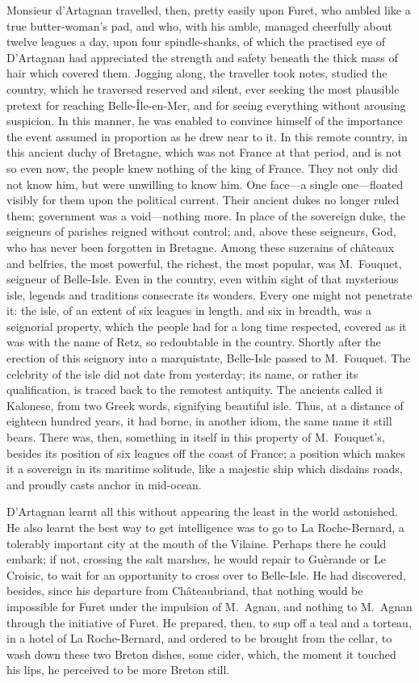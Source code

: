 Monsieur d'Artagnan travelled, then, pretty easily upon Furet, who ambled like a true butter-woman's pad, and who, with his amble, managed cheerfully about twelve leagues a day, upon four spindle-shanks, of which the practised eye of D'Artagnan had appreciated the strength and safety beneath the thick mass of hair which covered them. Jogging along, the traveller took notes, studied the country, which he traversed reserved and silent, ever seeking the most plausible pretext for reaching Belle-Île-en-Mer, and for seeing everything without arousing suspicion. In this manner, he was enabled to convince himself of the importance the event assumed in proportion as he drew near to it. In this remote country, in this ancient duchy of Bretagne, which was not France at that period, and is not so even now, the people knew nothing of the king of France. They not only did not know him, but were unwilling to know him. One face—a single one—floated visibly for them upon the political current. Their ancient dukes no longer ruled them; government was a void—nothing more. In place of the sovereign duke, the seigneurs of parishes reigned without control; and, above these seigneurs, God, who has never been forgotten in Bretagne. Among these suzerains of châteaux and belfries, the most powerful, the richest, the most popular, was M.~Fouquet, seigneur of Belle-Isle. Even in the country, even within sight of that mysterious isle, legends and traditions consecrate its wonders. Every one might not penetrate it: the isle, of an extent of six leagues in length, and six in breadth, was a seignorial property, which the people had for a long time respected, covered as it was with the name of Retz, so redoubtable in the country. Shortly after the erection of this seignory into a marquistate, Belle-Isle passed to M.~Fouquet. The celebrity of the isle did not date from yesterday; its name, or rather its qualification, is traced back to the remotest antiquity. The ancients called it Kalonese, from two Greek words, signifying beautiful isle. Thus, at a distance of eighteen hundred years, it had borne, in another idiom, the same name it still bears. There was, then, something in itself in this property of M.~Fouquet's, besides its position of six leagues off the coast of France; a position which makes it a sovereign in its maritime solitude, like a majestic ship which disdains roads, and proudly casts anchor in mid-ocean.

D'Artagnan learnt all this without appearing the least in the world astonished. He also learnt the best way to get intelligence was to go to La Roche-Bernard, a tolerably important city at the mouth of the Vilaine. Perhaps there he could embark; if not, crossing the salt marshes, he would repair to Guèrande or Le Croisic, to wait for an opportunity to cross over to Belle-Isle. He had discovered, besides, since his departure from Châteaubriand, that nothing would be impossible for Furet under the impulsion of M.~Agnan, and nothing to M.~Agnan through the initiative of Furet. He prepared, then, to sup off a teal and a torteau, in a hotel of La Roche-Bernard, and ordered to be brought from the cellar, to wash down these two Breton dishes, some cider, which, the moment it touched his lips, he perceived to be more Breton still. 